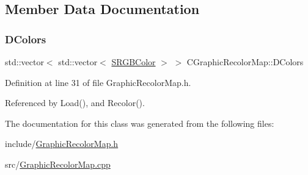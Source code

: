 \subsection{Member Data Documentation}
\hypertarget{classCGraphicRecolorMap_a9dea9a9e96e4465a53a40c4a34cebf71}{}\label{classCGraphicRecolorMap_a9dea9a9e96e4465a53a40c4a34cebf71} 
\subsubsection{\texorpdfstring{D\+Colors}{DColors}}
{\footnotesize\ttfamily std\+::vector$<$ std\+::vector$<$ \hyperlink{structCGraphicRecolorMap_1_1SRGBColor}{S\+R\+G\+B\+Color} $>$ $>$ C\+Graphic\+Recolor\+Map\+::\+D\+Colors\hspace{0.3cm}{\ttfamily [protected]}}



Definition at line 31 of file Graphic\+Recolor\+Map.\+h.



Referenced by Load(), and Recolor().



The documentation for this class was generated from the following files\+:\begin{DoxyCompactItemize}
\item 
include/\hyperlink{GraphicRecolorMap_8h}{Graphic\+Recolor\+Map.\+h}\item 
src/\hyperlink{GraphicRecolorMap_8cpp}{Graphic\+Recolor\+Map.\+cpp}\end{DoxyCompactItemize}
